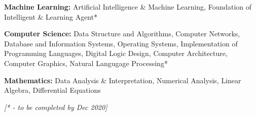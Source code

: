 \begin{cventries}
  \cventry
    {}
    {}
    {}
    {}
    {
    \vspace*{-0.4cm}
      \begin{cvitems}
        \item {\textbf{Machine Learning: }\hspace{0.9mm}Artificial Intelligence \& Machine Learning, Foundation of Intelligent \& Learning Agent*}
        \vspace{0.3mm}
        \item {\textbf{Computer Science: }\hspace{0.7mm}Data Structure and Algorithms, Computer Networks, Database and Information Systems, \hspace*{3.2cm}Operating Systems, Implementation of Programming Languages, Digital Logic Design, \hspace*{3.2cm}Computer Architecture, Computer Graphics, Natural Langugage Processing*}
        \vspace{0.3mm}
        \item{\textbf{Mathematics: }\hspace{8.5mm}Data Analysis \& Interpretation, Numerical Analysis, Linear Algebra, Differential Equations\newline}
      \end{cvitems} 
    }
    
\end{cventries}
\vspace*{-0.8cm}
\hfill \fontsize{9pt}{1em} {\slshape\color{darkgray} [* - to be completed by Dec 2020]}

\vspace{-0.8mm}
